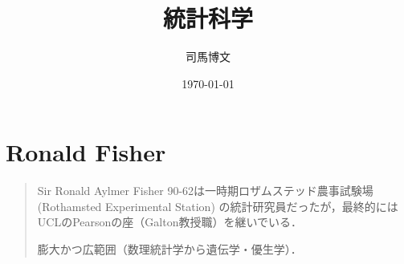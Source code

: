 \documentclass[uplatex,dvipdfmx]{jsreport}
\title{統計科学}
\author{司馬博文}
\date{\today}
\begin{document}
\tableofcontents

\chapter{Ronald Fisher}

\begin{quotation}
    Sir Ronald Aylmer Fisher 90-62は一時期ロザムステッド農事試験場 (Rothamsted Experimental Station) の統計研究員だったが，最終的にはUCLのPearsonの座（Galton教授職）を継いでいる．

    膨大かつ広範囲（数理統計学から遺伝学・優生学）．
    
\end{quotation}
\end{document}
